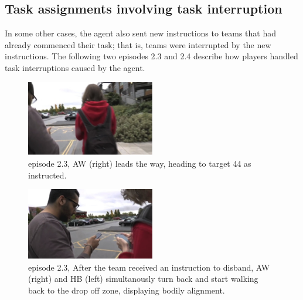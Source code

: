 \subsection{Task assignments involving task interruption}
In some other cases, the agent also sent new instructions to teams that had already commenced their task; that is, teams were interrupted by the new instructions. The following two episodes 2.3 and 2.4 describe how players handled task interruptions caused by the agent.\\

\begin{figure}[ht]
\centering
\includegraphics[width=0.5\textwidth]{img/study2/ep3/ep31}
\caption{episode 2.3, AW (right) leads the way, heading to target 44 as instructed.}
\label{fig:study2ep31}
\end{figure}

\begin{figure}[ht]
\centering
\includegraphics[width=0.5\textwidth]{img/study2/ep3/ep32}
\caption{episode 2.3, After the team received an instruction to disband, AW (right) and HB (left) simultanously turn back and start walking back to the drop off zone, displaying bodily alignment.}
\label{fig:study2ep32}

\end{figure}


